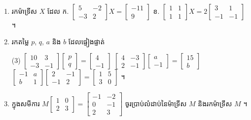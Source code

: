 \begin{enumerate}[1]
\begin{enumerate}[a]
    \item $A^{-1}$, $B^{-1}$, $B^{-1}A^{-1}$
    \item តើអ្នកសង្កេតឃើញយ៉ាងណាចំពោះ $(AB)^{-1}$ និង $B^{-1}A^{-1}$ ។
  \end{enumerate}
  \item រកម៉ាទ្រីស $X$ ដែល \quad ក. $\begin{bmatrix} 5 & -2\\ -3 & 2 \end{bmatrix}X = \begin{bmatrix} -11\\ 9 \end{bmatrix}$ \qquad ខ. $\begin{bmatrix} 1 & 1\\ 1 & 1 \end{bmatrix}X = 2\begin{bmatrix} 3 & 1\\ -1 & -1 \end{bmatrix}$ ។
  \item រកតម្លៃ $p$, $q$, $a$ និង $b$ ដែលផ្ទៀងផ្ទាត់
  \begin{tasks}(3)
    \task $\begin{bmatrix} 10 & 3\\ -3 & -1 \end{bmatrix}\begin{bmatrix} p\\ q \end{bmatrix} = \begin{bmatrix} 4\\ -1 \end{bmatrix}$
    \task $\begin{bmatrix} 4 & -3\\ 2 & -1 \end{bmatrix}\begin{bmatrix} a\\ -1 \end{bmatrix} = \begin{bmatrix} 15\\ b \end{bmatrix}$
    \task $\begin{bmatrix} -1 & a\\ b & 1 \end{bmatrix}\begin{bmatrix} 2 & -1\\ -1 & 2 \end{bmatrix} = \begin{bmatrix} 1 & 5\\ 3 & 0 \end{bmatrix}$ ។
  \end{tasks}
  \item ក្នុងសមីការ $M\begin{bmatrix} 1 & 0\\ 2 & 3 \end{bmatrix} = \begin{bmatrix} -1 & -2\\ 0 & -1\\ 2 & 3 \end{bmatrix}$ ចូរប្រាប់លំដាប់នៃម៉ាទ្រីស $M$ និងរកម៉ាទ្រីស $M$ ។
\end{enumerate}
